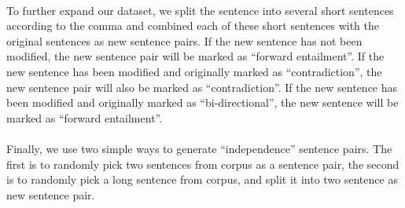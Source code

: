 \documentclass{article}
\begin{document}
\begin{CJK*}{UTF8}{bkai}
\paragraph{}
To further expand our dataset, we split the sentence into several short sentences according to the comma and combined each of these short sentences with the original sentences as new sentence pairs. If the new sentence has not been modified, the new sentence pair will be marked as ``forward entailment''. If the new sentence has been modified and originally marked as ``contradiction'', the new sentence pair will also be marked as ``contradiction''. If the new sentence has been modified and originally marked as ``bi-directional'', the new sentence will be marked as ``forward entailment''.

\paragraph{}
Finally, we use two simple ways to generate ``independence'' sentence pairs. The first is to randomly pick two sentences from corpus as a sentence pair, the second is to randomly pick a long sentence from corpus, and split it into two sentence as new sentence pair.





\end{CJK*}
\end{document}
